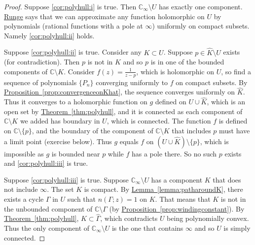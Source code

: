 \documentclass[12pt,openany]{book}
\newcommand{\C}{{\mathbb{C}}}
\theoremstyle{plain}
\theoremstyle{remark}
\theoremstyle{definition}
\theoremstyle{exercise}
\theoremstyle{example}
\newcommand{\thmref}[1]{\hyperref[#1]{Theorem~\ref*{#1}}}
\newcommand{\propref}[1]{\hyperref[#1]{Proposition~\ref*{#1}}}
\newcommand{\lemmaref}[1]{\hyperref[#1]{Lemma~\ref*{#1}}}
\begin{document}
\begin{proof}
Suppose \ref{cor:polyhull:i} is true.
Then $\C_\infty \setminus U$ has exactly one component.
\hyperref[cor:rungeseq]{Runge} says that we can approximate any function
holomorphic on $U$ by polynomials
(rational functions with a pole at $\infty$) uniformly on compact subsets.
Namely \ref{cor:polyhull:ii} holds.

Suppose \ref{cor:polyhull:ii} is true.
Consider any $K \subset U$.  Suppose $p \in \widehat{K} \setminus U$ exists
(for contradiction).
Then $p$ is not in $K$ and so $p$ is in one of the bounded components of $\C \setminus K$.
Consider $f(z) = \frac{1}{z-p}$, which is holomorphic on $U$, so find
a sequence of polynomials $\{ P_n \}$ converging uniformly to $f$ on compact
subsets.
By \propref{prop:convergenceonKhat},
the sequence converges uniformly on $\widehat{K}$.
Thus it converges to a holomorphic function on
$g$ defined on $U \cup \widehat{K}$, which is an open set by
\thmref{thm:polyhull}, and it is connected as each component of $\C \setminus K$ we added
has boundary in $U$, which is connected.
The function $f$ is defined on $\C \setminus \{ p \}$,
and the boundary of the component of $\C \setminus K$ that includes $p$ must
have a limit point (exercise below).
Thus $g$ equals $f$ on $(U \cup \widehat{K}) \setminus \{ p \}$, which is
impossible as $g$ is bounded near $p$ while $f$ has a pole there.  So no
such $p$ exists and \ref{cor:polyhull:iii} is true.

Suppose \ref{cor:polyhull:iii} is true.  Suppose $\C_\infty \setminus U$
has a component $K$ that does not include $\infty$.  The set $K$ is compact.
By \lemmaref{lemma:patharoundK}, there exists a cycle $\Gamma$ 
in $U$ such that $n(\Gamma;z) = 1$ on $K$.  That means that $K$ is
not in the unbounded component of $\C \setminus \Gamma$ (by
\propref{prop:windingconstant}).  By \thmref{thm:polyhull},
$K \subset \widehat{\Gamma}$,
which contradicts $U$ being polynomially convex.  Thus the only component of $\C_\infty
\setminus U$ is the one that contains $\infty$ and so $U$ is simply
connected.
\end{proof}
\end{document}
